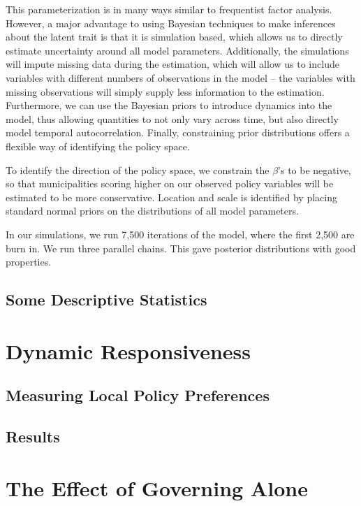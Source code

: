 \documentclass[a4paper,11pt]{article}
\begin{document}
This parameterization is in many ways similar to frequentist factor analysis. However, a major advantage to using Bayesian techniques to make inferences about the latent trait is that it is simulation based, which allows us to directly estimate uncertainty around all model parameters. Additionally, the simulations will impute missing data during the estimation, which will allow us to include variables with different numbers of observations in the model -- the variables with missing observations will simply supply less information to the estimation. Furthermore, we can use the Bayesian priors to introduce dynamics into the model, thus allowing quantities to not only vary across time, but also directly model temporal autocorrelation. Finally, constraining prior distributions offers a flexible way of identifying the policy space.

To identify the direction of the policy space, we constrain the $\beta$'s to be negative, so that municipalities scoring higher on our observed policy variables will be estimated to be more conservative. Location and scale is identified by placing standard normal priors on the distributions of all model parameters.

In our simulations, we run 7,500 iterations of the model, where the first 2,500 are burn in. We run three parallel chains. This gave posterior distributions with good properties.



\subsection{Some Descriptive Statistics}

\section{Dynamic Responsiveness}

\subsection{Measuring Local Policy Preferences}

\subsection{Results}



\section{The Effect of Governing Alone}
\end{document}
